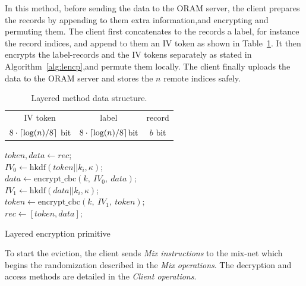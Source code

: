 \documentclass[USenglish,oneside,twocolumn]{article}
\DeclarePairedDelimiter{\ceil}{\lceil}{\rceil}
\begin{document}
\vspace{-.375cm}


In this method, before sending the data to the ORAM server, the client prepares the records by appending to them extra information,and  encrypting and permuting them. The client first concatenates to the records a label, for instance the record indices, and append to them an IV token as shown in Table~\ref{ldata}. It then encrypts the label-records and the IV tokens separately as stated in Algorithm~\ref{alg:lencp},and permute them locally. The client finally uploads the data to the ORAM server and stores the $n$ remote indices safely.
 
\vspace{-.25cm}
 
\begin{table}[H]
\begin{minipage}[t][][b]{.475\textwidth}
\vspace{0pt}
\centering
\begin{tabular}{|c|c|c|}
IV token  &  label & record\\
$8\cdot\ceil{\log(n)/8}$ bit  &  $8\cdot\ceil{\log(n)/8}$bit &$b$ bit   \\
\end{tabular}
\centering
\caption{Layered method data structure.}
\label{ldata}
\end{minipage}
\end{table}

\vspace{-1.3cm}

\begin{algorithm}
\DontPrintSemicolon
{}
$token, data \gets rec$;\\
$IV_0 \gets \text{hkdf}(token||k_i, \kappa)$;\\
$data \gets \text{encrypt\_cbc}\left(k,\ IV_0,\ data \right )$;\\
$IV_1 \gets \text{hkdf}(data || k_i, \kappa)$;\\
$token \gets \text{encrypt\_cbc}\left(k,\ IV_1,\ token \right )$;\\
$rec \gets [token, data]$;\\
\caption{Layered encryption primitive}
\label{alg:lencp}
\end{algorithm}

\vspace{-.4cm}

To start the eviction, the client sends \emph{Mix instructions} to the mix-net which  begins the randomization described in the \emph{Mix operations}. The decryption and access methods are detailed in the \emph{Client operations}.\\\\
\end{document}
